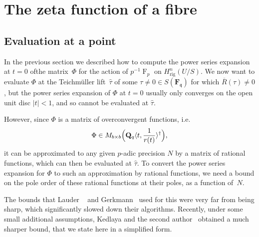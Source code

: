 \documentclass[a4paper,11pt]{article}
\numberwithin{equation}{section}
\providecommand{\abs}[1]{\lvert#1\rvert}                 %
\newcommand{\QQ}{\mathbf{Q}} %
\newcommand{\FF}{\mathbf{F}} %
\DeclareMathOperator{\Frob}{F}           %
\providecommand{\Hrig}{H_{\text{rig}}}  %
\theoremstyle{definition}
\begin{document}

\section{The zeta function of a fibre}

\subsection{Evaluation at a point}
\label{sec:Evaluation}

In the previous section we described how to compute the power series 
expansion at $t=0$ ofthe matrix~$\Phi$ for the action of $p^{-1} \Frob_p$ on 
$\Hrig^{n}(U/S)$. We now want to evaluate $\Phi$ at the Teichm\"uller 
lift~$\hat{\tau}$ of some $\tau \neq 0 \in S(\FF_{\mathfrak{q}})$ for 
which $\overline{R}(\tau) \neq 0$, but the power series expansion of $\Phi$ 
at $t=0$ usually only converges on the open unit disc $\abs{t} < 1$, 
and so cannot be evaluated at $\hat{\tau}$. 

However, since $\Phi$ is a matrix of overconvergent functions, i.e.\ 
\[
\Phi \in M_{b \times b}\Bigl(\QQ_q \langle t,\frac{1}{r(t)} \rangle^{\dag}\Bigr),
\]
it can be approximated to any given $p$-adic precision $N$ by a matrix 
of rational functions, which can then be evaluated at $\hat{\tau}$. To 
convert the power series expansion for $\Phi$ to such an approximation 
by rational functions, we need a bound on the pole order of these 
rational functions at their poles, as a function of~$N$.

The bounds that Lauder ~\citep[\S 8.1]{Lauder2004a} and 
Gerkmann~\citep[\S 6]{Gerkmann2007} used for this were very far from 
being sharp, which significantly slowed down their algorithms.
Recently, under some small additional assumptions, Kedlaya and the second 
author~\citep[Theorem~2.1]{KedlayaTuitman2012} obtained a much sharper bound,
that we state here in a simplified form.
\end{document}
